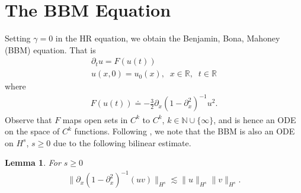\documentclass[12pt,reqno]{amsart}
\numberwithin{equation}{section}  %
\newcommand{\rr}{\mathbb{R}}
\newcommand{\p}{\partial}
\newtheorem{lemma}[theorem]{Lemma}
\begin{document}
\section{The BBM Equation} 
\label{sec:}
Setting $\gamma = 0$ in the HR equation, we obtain the Benjamin, Bona,
Mahoney (BBM) equation. That is
%
%
\begin{gather*}
    \p_{t} u = F(u(t))
    \\
     u(x,0) = u_0(x), \; \; x \in \rr, \; \; t \in \rr
\end{gather*}
where
%
%
\begin{equation*}
\begin{split}
    F(u(t)) \doteq -\frac{3}{2} \p_{x}(1 - \p_{x}^{2})^{-1} u^{2}.
\end{split}
\end{equation*}
%
Observe that $F$ maps open sets in $C^{k}$ to $C^{k}$,  $k \in \mathbb N \cup
\{\infty \}$, and is hence an ODE on the space of $C^{k}$ functions. Following
\cite{Bona_2009_Sharp-well-pose}, we note that the BBM is also an ODE on
$H^{s}$, $s \ge 0$ due to the following bilinear estimate.
%
%
%
%
%
%
%
%
\begin{lemma}
For $s \ge 0$
%
%
\begin{equation*}
\begin{split}
    \| \p_{x}(1 - \p_{x}^{2})^{-1} (uv) \|_{H^{s}} \lesssim \| u \|_{H^{s}} \| v \|_{H^{s}}.
\end{split}
\end{equation*}
%
%
\label{lem:bbm-bilin-est}
\end{lemma}
%
%
%
\end{document}
